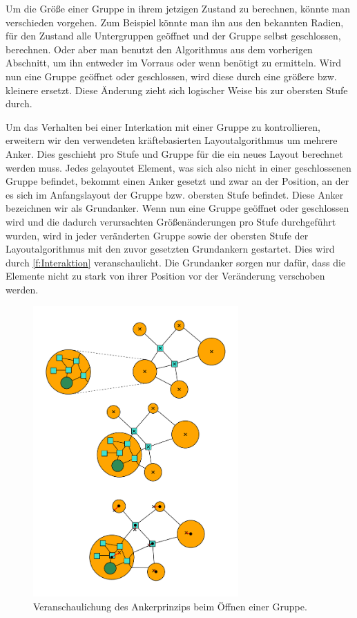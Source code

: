 Um die Größe einer Gruppe in ihrem jetzigen Zustand zu berechnen, könnte man verschieden vorgehen. 
Zum Beispiel könnte man ihn aus den bekannten Radien, für den Zustand alle Untergruppen geöffnet und der Gruppe selbst geschlossen, berechnen. 
Oder aber man benutzt den Algorithmus aus dem vorherigen Abschnitt, um ihn entweder im Vorraus oder wenn benötigt zu ermitteln. 
Wird nun eine Gruppe geöffnet oder geschlossen, wird diese durch eine größere bzw. kleinere ersetzt. 
Diese Änderung zieht sich logischer Weise bis zur obersten Stufe durch.

Um das Verhalten bei einer Interkation mit einer Gruppe zu kontrollieren, erweitern wir den verwendeten kräftebasierten Layoutalgorithmus um mehrere Anker. 
Dies geschieht pro Stufe und Gruppe für die ein neues Layout berechnet werden muss.
Jedes gelayoutet Element, was sich also nicht in einer geschlossenen Gruppe befindet, bekommt einen Anker gesetzt und zwar an der Position, 
an der es sich im Anfangslayout der Gruppe bzw. obersten Stufe befindet. 
Diese Anker bezeichnen wir als Grundanker. 
Wenn nun eine Gruppe geöffnet oder geschlossen wird und die dadurch verursachten Größenänderungen pro Stufe durchgeführt wurden, 
wird in jeder veränderten Gruppe sowie der obersten Stufe der Layoutalgorithmus mit den zuvor gesetzten Grundankern gestartet. 
Dies wird  durch \autoref{f:Interaktion} veranschaulicht. 
Die Grundanker sorgen nur dafür, dass die Elemente nicht zu stark von ihrer Position vor der Veränderung verschoben werden.

\begin{figure}[h!]
\begin{center} 
  \includegraphics[width=0.7\textwidth]{Pics/Interaktion.pdf}
  \caption{Veranschaulichung des Ankerprinzips beim Öffnen einer Gruppe.}
  \label{f:Interaktion}
\end{center}
\end{figure}


